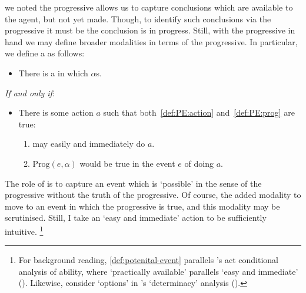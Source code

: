 \begin{note}
  we noted the progressive allows us to capture conclusions which are available to the agent, but not yet made.
  Though, to identify such conclusions via the progressive it must be the conclusion is in progress.
  Still, with the progressive in hand we may define broader modalities in terms of the progressive.
  In particular, we define a \pevent{} as follows:

  \begin{definition}[\pevent{3}]
    \label{def:potenital-event}

    \begin{itemize}
    \item
      There is a \emph{\pevent{}} in which \vAgent{} \(\alpha\)s.
    \end{itemize}

    \emph{If and only if}:

    \begin{itemize}
    \item
      There is some action \(a\) such that both~\ref{def:PE:action} and~\ref{def:PE:prog} are true:

      \begin{enumerate}[label=\alph*., ref=(\alph*)]
      \item
        \label{def:PE:action}
        \vAgent{} may easily and immediately do \(a\).
      \item
        \label{def:PE:prog}
        \(\text{Prog}(e, \alpha)\) would be true in the event \(e\) of \vAgent{} doing \(a\).
      \end{enumerate}
    \end{itemize}
    \vspace{-\baselineskip}
  \end{definition}

  The role of  is to capture an event which is `possible' in the sense of the progressive without the truth of the progressive.
  Of course, the added modality to move to an event in which the progressive is true, and this modality may be scrutinised.
  Still, I take an `easy and immediate' action to be sufficiently intuitive.%
  \footnote{
    For background reading, \autoref{def:potenital-event} parallels \citeauthor{Mandelkern:2017aa}'s act conditional analysis of ability, where `practically available' parallels `easy and immediate' (\citeyear[\S5]{Mandelkern:2017aa}).
    Likewise, consider `options' in \citeauthor{Boylan:2020aa}'s `determinacy' analysis (\citeyear[\S4]{Boylan:2020aa}).
  }
\end{note}

